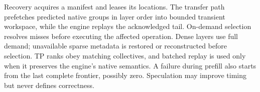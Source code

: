 Recovery acquires a manifest and leases its locations. The transfer path
prefetches predicted native groups in layer order into bounded transient
workspace, while the engine replays the acknowledged tail. On-demand
selection resolves misses before executing the affected operation. Dense
layers use full demand; unavailable sparse metadata is restored or
reconstructed before selection. TP ranks obey matching collectives, and
batched replay is used only when it preserves the engine's native
semantics. A failure during prefill also starts from the last complete frontier,
possibly zero. Speculation may improve timing but never defines correctness.

